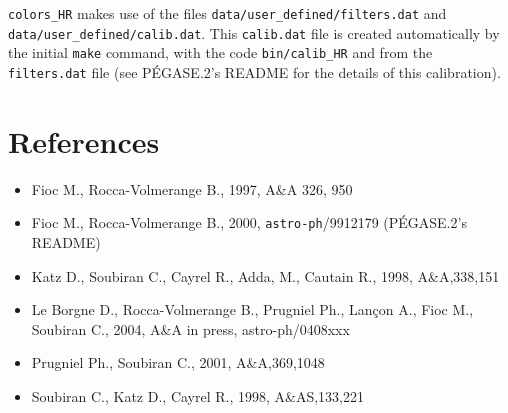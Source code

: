 \documentclass[11pt,fleqn]{article}
\begin{document}
\texttt{colors\_HR} makes use of the files
\texttt{data/user\_defined/filters.dat} and
\texttt{data/user\_defined/calib.dat}.
This \texttt{calib.dat} file is created automatically by the initial
\texttt{make} command, with the code \texttt{bin/calib\_HR} and from 
the \texttt{filters.dat} file (see
P\'EGASE.2's README for the details of this calibration).



\section{References}
\begin{itemize}
\itemindent=-0.5cm
 \item[] Fioc M., Rocca-$\!$Volmerange B., 1997, A\&A 326, 950
 \item[] Fioc M., Rocca-$\!$Volmerange B., 2000, \texttt{astro-ph}/9912179
 (P\'EGASE.2's README)
\item[] Katz D., Soubiran C., Cayrel R., Adda, M., Cautain R., 1998, A\&A,338,151
 \item[] Le Borgne D.,  Rocca-Volmerange B., Prugniel Ph., Lan\c{c}on A., Fioc M., Soubiran C., 2004, A\&A in press, astro-ph/0408xxx
\item[] Prugniel Ph., Soubiran C., 2001, A\&A,369,1048
\item[] Soubiran C., Katz D., Cayrel R., 1998, A\&AS,133,221
\end{itemize}
\end{document}
